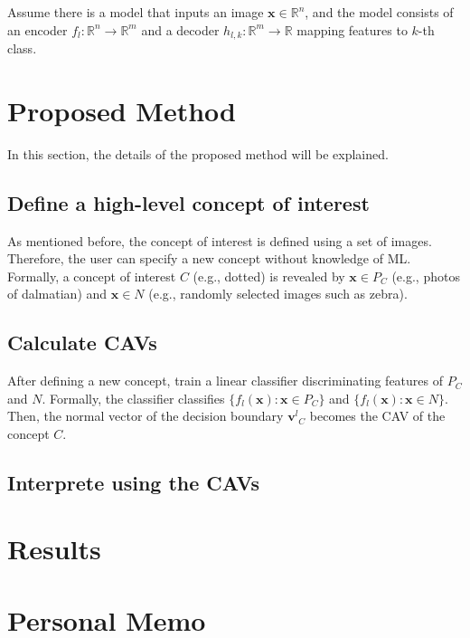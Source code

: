 \documentclass[10pt,twocolumn,letterpaper]{article}
\begin{document}
Assume there is a model that inputs an image $\mathbf{x} \in \mathbb{R}^n$, and the model consists of an encoder $f_l: \mathbb{R}^n \rightarrow \mathbb{R}^m$ and a decoder $h_{l, k}: \mathbb{R}^m \rightarrow \mathbb{R}$ mapping features to $k$-th class.

\section{Proposed Method}
In this section, the details of the proposed method will be explained.
\subsection{Define a high-level concept of interest}
As mentioned before, the concept of interest is defined using a set of images. Therefore, the user can specify a new concept without knowledge of ML. Formally, a concept of interest $C$ (e.g., dotted) is revealed by $\mathbf{x} \in P_C$ (e.g., photos of dalmatian) and $\mathbf{x} \in N$ (e.g., randomly selected images such as zebra).

\subsection{Calculate CAVs}
After defining a new concept, train a linear classifier discriminating features of $P_C$ and $N$. Formally, the classifier classifies $\{f_l(\mathbf{x}): \mathbf{x} \in P_C\}$ and $\{f_l(\mathbf{x}): \mathbf{x} \in N\}$. Then, the normal vector of the decision boundary ${\mathbf{v}^{l}}_C$ becomes the CAV of the concept $C$.

\subsection{Interprete using the CAVs}




\section{Results}


\section{Personal Memo}


{\small

% 
}
\end{document}
